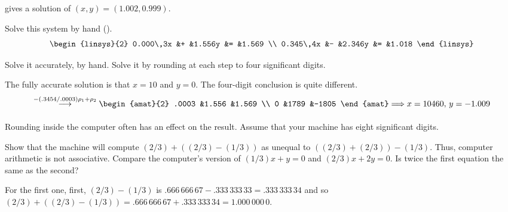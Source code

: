 \begin{exercises}
\begin{answer}
      gives a solution of \( (x,y)=(1.002,0.999) \).
    \end{answer}
  \item 
    Solve this system by hand (\cite{Rice}).
    \begin{equation*}
      \begin{linsys}{2}
        0.000\,3x  &+  &1.556y  &=  &1.569 \\
        0.345\,4x  &-  &2.346y  &=  &1.018
      \end{linsys}
    \end{equation*}
    \begin{exparts*}
      \partsitem Solve it accurately, by hand.
      \partsitem Solve it by
         rounding at each step to four significant digits. 
    \end{exparts*}
    \begin{answer}
      \begin{exparts}
        \partsitem The fully accurate solution is that $x=10$ and $y=0$.
        \partsitem The four-digit conclusion is quite different.
          \begin{equation*}
            \grstep{-(.3454/.0003)\rho_1+\rho_2}
            \begin{amat}{2}
              .0003  &1.556  &1.569  \\
              0      &1789   &-1805
            \end{amat}
            \Longrightarrow
            x=10460,\,y=-1.009
          \end{equation*}
      \end{exparts}
    \end{answer}
  \item 
    Rounding inside the computer often has an effect on the result.
    Assume that your machine has eight significant digits.
    \begin{exparts}
      \partsitem Show that the machine will compute 
         $(2/3)+((2/3)-(1/3))$ as unequal to $((2/3)+(2/3))-(1/3)$.
         Thus, computer arithmetic is not associative.
      \partsitem Compare the computer's version of $(1/3)x+y=0$
        and $(2/3)x+2y=0$.
        Is twice the first equation the same as the second?
    \end{exparts}
    \begin{answer}
      \begin{exparts}
        \partsitem For the first one, first, $(2/3)-(1/3)$ is 
          $.666\,666\,67-.333\,333\,33=.333\,333\,34$
          and so 
          $(2/3)+((2/3)-(1/3))=.666\,666\,67+.333\,333\,34=1.000\,000\,0$.

\end{exparts}
\end{answer}
\end{exercises}
